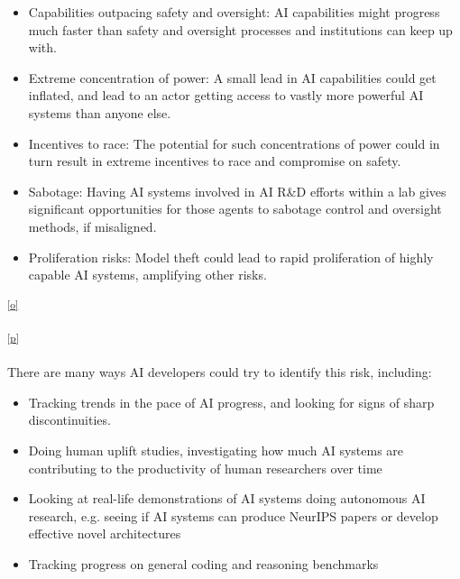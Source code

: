 \documentclass[
]{article}
\providecommand{\tightlist}{%
  \setlength{\itemsep}{0pt}\setlength{\parskip}{0pt}}
\begin{document}
\begin{itemize}
\tightlist
\item
  {Capabilities outpacing safety and oversight: }{AI capabilities might
  progress much faster than safety and oversight processes and
  institutions can keep up with.}
\item
  {Extreme concentration of power: }{A small lead in AI capabilities
  could get inflated, and lead to an actor getting access to vastly more
  powerful AI systems than anyone else. }
\end{itemize}

\begin{itemize}
\tightlist
\item
  {Incentives to race: }{The potential for such concentrations of power
  could in turn result in extreme incentives to race and compromise on
  safety.}
\end{itemize}

\begin{itemize}
\tightlist
\item
  {Sabotage: }{Having AI systems involved in AI R\&D efforts within a
  lab gives significant opportunities for those agents to sabotage
  control and oversight methods, if misaligned.}
\item
  {Proliferation risks: }{Model theft could lead to rapid proliferation
  of highly capable AI systems, amplifying other risks.}
\end{itemize}

\textsuperscript{\label{cmnt_ref15}\hyperref[cmnt15]{{[}o{]}}}

{}

\textsuperscript{\label{cmnt_ref16}\hyperref[cmnt16]{{[}p{]}}}

{There are many ways AI developers could try to identify this risk,
including:}

\begin{itemize}
\tightlist
\item
  {Tracking trends in the pace of AI progress, and looking for signs of
  sharp discontinuities.}
\item
  {Doing human uplift studies, investigating how much AI systems are
  contributing to the productivity of human researchers over time}
\item
  {Looking at real-life demonstrations of AI systems doing autonomous AI
  research, e.g. seeing if AI systems can produce NeurIPS papers or
  develop effective novel architectures}
\item
  {Tracking progress on general coding and reasoning benchmarks}
\end{itemize}
\end{document}
